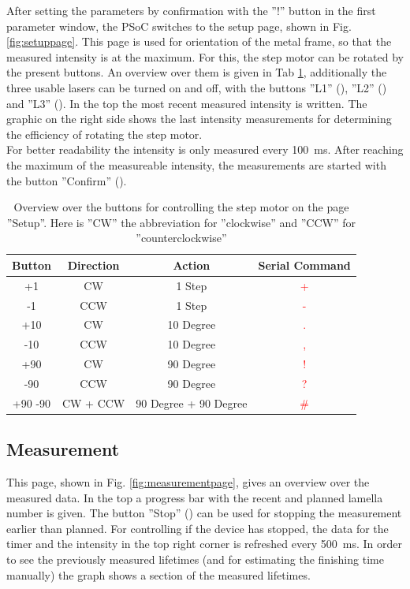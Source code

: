 	After setting the parameters by confirmation with the ''!'' button in the first parameter window, the PSoC switches to the setup page, shown in Fig. \ref{fig:setuppage}. 
	This page is used for orientation of the metal frame, so that the measured intensity is at the maximum.
	For this, the step motor can be rotated by the present buttons. An overview over them is given in Tab \ref{tab:OverviewSetupButtons}, additionally the three usable lasers can be turned on and off, with the buttons ''L1'' (), ''L2'' () and ''L3'' (). In the top the most recent measured intensity is written. 
	The graphic on the right side shows the last intensity measurements for determining the efficiency of rotating the step motor. \\
	For better readability the intensity is only measured every \SI{100}{\milli\second}. 
	After reaching the maximum of the measureable intensity, the measurements are started with the button ''Confirm'' (). 
	\begin{table}[h]
		\centering
		\label{tab:OverviewSetupButtons}
		\caption{Overview over the buttons for controlling the step motor on the page ''Setup''. Here is ''CW'' the abbreviation for ''clockwise'' and ''CCW'' for ''counterclockwise''}
		\begin{tabular}{|c|c|c|c|}
			\hline 
			Button & Direction & Action & Serial Command \\ 
			\hline 
			+1 & CW & 1 Step & \textcolor{red}{+} \\ 
			\hline 
			-1 & CCW & 1 Step & \textcolor{red}{-} \\ 
			\hline 
			+10 & CW & 10 Degree & \textcolor{red}{.} \\ 
			\hline 
			-10 & CCW & 10 Degree & \textcolor{red}{,} \\ 
			\hline 
			+90 & CW & 90 Degree & \textcolor{red}{!} \\ 
			\hline 
			-90 & CCW & 90 Degree & \textcolor{red}{?} \\ 
			\hline 
			+90 -90 & CW + CCW & 90 Degree + 90 Degree  & \textcolor{red}{\#} \\ 
			\hline 
		\end{tabular} 
	\end{table}
	
	\subsection{Measurement}
	
	This page, shown in Fig.  \ref{fig:measurementpage}, gives an overview over the measured data. In the top a progress bar with the recent and planned lamella number is given. The button ''Stop'' () can be used for stopping the measurement earlier than planned. 
	For controlling if the device has stopped, the data for the timer and the intensity in the top right corner is refreshed every \SI{500}{\milli\second}. 
	In order to see the previously measured lifetimes (and for estimating the finishing time manually) the graph shows a section of the measured lifetimes. 

